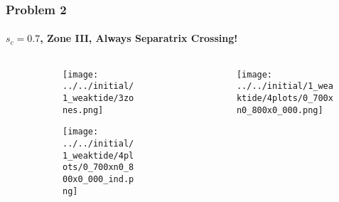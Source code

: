 \documentclass[dvipsnames, 11pt]{beamer}
\begin{document}
\begin{frame}
    \frametitle{Problem 2}
    \framesubtitle{$s_c = 0.7$, Zone III, Always Separatrix Crossing!}

    \begin{columns}
        \begin{column}{0.5\textwidth}
            \begin{figure}
                \centering
                \begin{subfigure}{\columnwidth}
                    \centering
                    \texttt{[image: ../../initial/1\_weaktide/3zones.png]}
                \end{subfigure}

                \begin{subfigure}{\columnwidth}
                    \centering
                    \texttt{[image: ../../initial/1\_weaktide/4plots/0\_700xn0\_800x0\_000\_ind.png]}
                \end{subfigure}
            \end{figure}
        \end{column}
        \begin{column}{0.5\textwidth}
            \begin{figure}[t]
                \centering
                \texttt{[image: ../../initial/1\_weaktide/4plots/0\_700xn0\_800x0\_000.png]}
            \end{figure}
        \end{column}
    \end{columns}
\end{frame}
\end{document}
